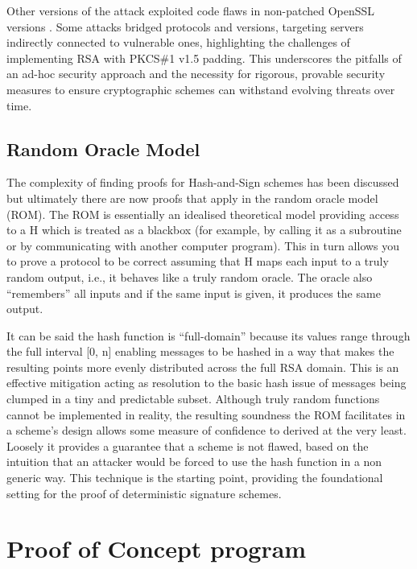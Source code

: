 \documentclass[]{final_report}
\theoremstyle{definition}
\begin{document}
Other versions of the attack exploited code flaws in non-patched OpenSSL versions \cite{CVE-2006-4339}. Some attacks bridged protocols and versions, targeting servers indirectly connected to vulnerable ones, highlighting the challenges of implementing RSA with PKCS\#1 v1.5 padding. This underscores the pitfalls of an ad-hoc security approach and the necessity for rigorous, provable security measures to ensure cryptographic schemes can withstand evolving threats over time.


\section{Random Oracle Model}
\label{subSec:ROM}
The complexity of finding proofs for Hash-and-Sign schemes has been discussed but ultimately there are now proofs that apply in the random oracle model (ROM). The ROM \cite{10.1145/168588.168596} is essentially an idealised theoretical model providing access to a H which is treated as a blackbox (for example, by calling it as a subroutine or by communicating with another computer program). This in turn allows you to prove a protocol to be correct assuming that H maps each input to a truly random output, i.e., it behaves like a truly random oracle. 
The oracle also “remembers” all inputs and if the same input is given, it produces the same output. 

It can be said the hash function is “full-domain” because its values range through the full interval [0, n] enabling messages to be hashed in a way that makes the resulting points more evenly distributed across the full RSA domain. This is an effective mitigation acting as resolution to the basic hash issue of messages being clumped in a tiny and predictable subset. 
Although truly random functions cannot be implemented in reality, the resulting soundness the ROM facilitates in a scheme’s design allows some measure of confidence to derived at the very least. Loosely it provides a guarantee that a scheme is not flawed, based on the intuition that an attacker would be forced to use the hash function in a non generic way. This technique is the starting point, providing the foundational setting for the proof of deterministic signature schemes.








\chapter{Proof of Concept program}
\end{document}
